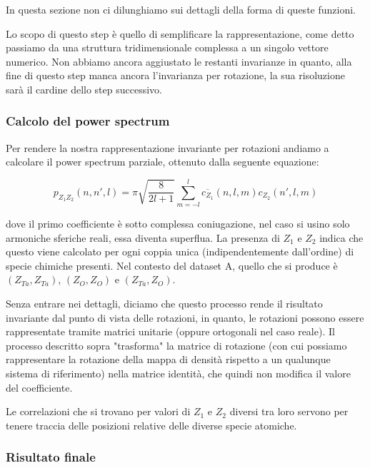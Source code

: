 In questa sezione non ci dilunghiamo sui dettagli della forma di queste funzioni.

Lo scopo di questo step è quello di semplificare la rappresentazione, come detto passiamo da una struttura tridimensionale complessa a un singolo vettore numerico. Non abbiamo ancora aggiustato le restanti invarianze in quanto, alla fine di questo step manca ancora l'invarianza per rotazione, la sua risoluzione sarà il cardine dello step successivo.

\subsubsection{Calcolo del power spectrum}

Per rendere la nostra rappresentazione invariante per rotazioni andiamo a calcolare il power spectrum parziale, ottenuto dalla seguente equazione:

\begin{equation}
    p_{Z_1Z_2}(n,n',l) = \pi \sqrt{\frac{8}{2l+1}} \sum_{m=-l}^{l} \overline{c_{Z_1}}(n,l,m) c_{Z_2}(n',l,m)
    \label{eq:power-spectrum}
\end{equation}

dove il primo coefficiente è sotto complessa coniugazione, nel caso si usino solo armoniche sferiche reali, essa diventa superflua. La presenza di $Z_1$ e $Z_2$ indica che questo viene calcolato per ogni coppia unica (indipendentemente dall'ordine) di specie chimiche presenti. Nel contesto del dataset A, quello che si produce è $(Z_{Ta},Z_{Ta})$, $(Z_{O},Z_{O})$ e $(Z_{Ta},Z_{O})$.

Senza entrare nei dettagli, diciamo che questo processo rende il risultato invariante dal punto di vista delle rotazioni, in quanto, le rotazioni possono essere rappresentate tramite matrici unitarie (oppure ortogonali nel caso reale). Il processo descritto sopra "trasforma" la matrice di rotazione (con cui possiamo rappresentare la rotazione della mappa di densità rispetto a un qualunque sistema di riferimento) nella matrice identità, che quindi non modifica il valore del coefficiente.

Le correlazioni che si trovano per valori di $Z_1$ e $Z_2$ diversi tra loro servono per tenere traccia delle posizioni relative delle diverse specie atomiche.

\subsubsection{Risultato finale}

